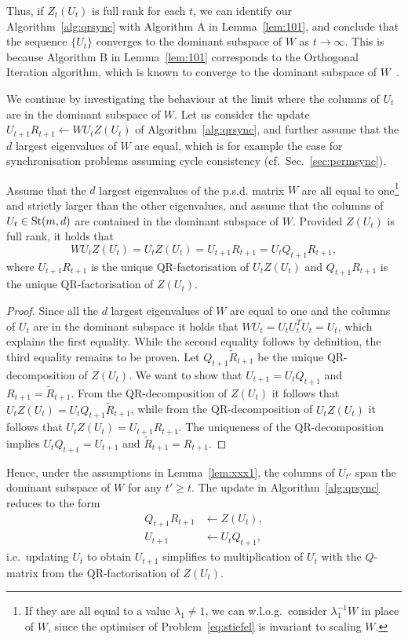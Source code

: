 \documentclass{article}
\begin{document}
%
Thus, if $Z_t(U_t)$ is full rank for each $t$, we can identify our Algorithm~\ref{alg:qrsync} with Algorithm A in Lemma~\ref{lem:101}, and conclude that the sequence $\{U_t\}$ converges to the dominant subspace of $W$ as $t \rightarrow \infty$. This is because Algorithm B in Lemma~\ref{lem:101} corresponds to the Orthogonal Iteration algorithm, which is known to converge to the dominant subspace of $W$~\cite{golub2013matrix}. 
%
%

We continue by investigating the behaviour at the limit where the columns of $U_t$ are in the dominant subspace of $W$. Let us consider the update $U_{t+1}R_{t+1} \gets WU_t Z(U_t)$ of Algorithm~\ref{alg:qrsync},
%
%
%
and further assume that the $d$ largest eigenvalues of $W$ are equal, which is for example the case for synchronisation problems assuming cycle consistency (cf.~Sec.~\ref{sec:permsync}). 
%
%
%
%
\begin{lemma}\label{lem:xxx1}
%
%
Assume that the $d$ largest eigenvalues of the p.s.d. matrix $W$  are all equal to one\footnote{If they are all equal to a value $\lambda_1 \neq 1$, we can w.l.o.g.~consider $\lambda_1^{-1}W$ in place of $W$, since the optimiser of Problem~\eqref{eq:stiefel} is invariant to scaling $W$.} and strictly larger than the other eigenvalues, and assume that the columns of $U_t \in \operatorname{St}(m,d)$ are contained in the dominant subspace of $W$. 
Provided $Z(U_t)$ is full rank, it holds that 
$$WU_tZ(U_t) = U_tZ(U_t) = U_{t+1}R_{t+1} = U_tQ_{t+1}R_{t+1},$$
where $U_{t+1} R_{t+1}$ is the unique QR-factorisation of $U_tZ(U_t)$ and $Q_{t+1} R_{t+1}$ is the unique QR-factorisation of $Z(U_t)$.  
\end{lemma}

\begin{proof}
    Since all the $d$ largest eigenvalues of $W$ are equal to one and the columns of $U_t$ are in the dominant subspace it holds that $WU_t = U_tU_t^TU_t = U_t$, which explains the first equality. While the  second equality follows by definition, the third equality remains to be proven. 
    Let $Q_{t+1}\tilde{R}_{t+1}$ be the unique QR-decomposition of $Z(U_t)$.
    We want to show that $U_{t+1} = U_t Q_{t+1}$ and $R_{t+1} = \tilde{R}_{t+1}$.
    From the QR-decomposition of $Z(U_t)$ it follows that $U_t Z(U_t) = U_t  Q_{t+1}\tilde{R}_{t+1}$, while from the QR-decomposition of $U_t Z(U_t)$ it follows that $U_t Z(U_t) = U_{t+1}R_{t+1}$. The uniqueness of the QR-decomposition implies $U_t  Q_{t+1} = U_{t+1}$ and $\tilde{R}_{t+1} = R_{t+1}$.
\end{proof}
%
%
Hence, under the assumptions in Lemma~\ref{lem:xxx1}, the columns of $U_{t'}$ span the dominant subspace of $W$ for any $t' \geq t$. %
The update in  Algorithm~\ref{alg:qrsync} reduces to the  form
\begin{align}
\label{eq:nisse:1}
Q_{t+1}R_{t+1} & \gets Z(U_t),\\
    U_{t+1} & \gets U_{t}Q_{t+1}, \label{eq:nisse:2}
\end{align}
%
i.e.~updating $U_t$ to obtain $U_{t+1}$ simplifies to multiplication of $U_t$ with the $Q$-matrix from the QR-factorisation of $Z(U_t)$. 
\end{document}
